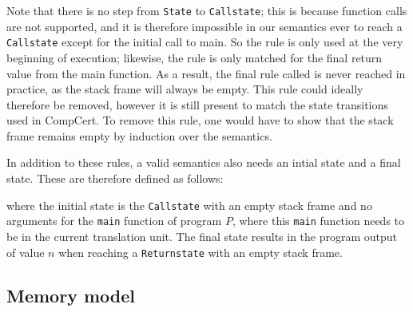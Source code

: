 Note that there is no step from \texttt{State} to \texttt{Callstate}; this is
because function calls are not supported, and it is therefore impossible in our
semantics ever to reach a \texttt{Callstate} except for the initial call to
main. So the  rule is only used at the very beginning
of execution; likewise, the  rule is only matched for
the final return value from the main function.  As a result, the final rule
called  is never reached in practice, as the stack
frame will always be empty.  This rule could ideally therefore be removed,
however it is still present to match the state transitions used in CompCert.  To
remove this rule, one would have to show that the stack frame remains empty by
induction over the semantics.

In addition to these rules, a valid semantics also needs an intial state and a
final state.  These are therefore defined as follows:
%

\noindent where the initial state is the \texttt{Callstate} with an empty stack
frame and no arguments for the \texttt{main} function of program $P$, where this
\texttt{main} function needs to be in the current translation unit.  The final
state results in the program output of value $n$ when reaching a
\texttt{Returnstate} with an empty stack frame.

\subsection{Memory model}\label{sec:verilog:memory}

